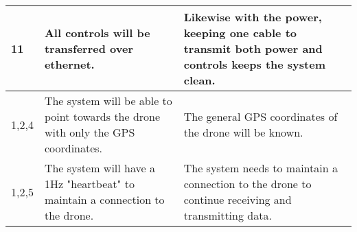 \documentclass[ProductRequirements.tex]{subfiles}
\begin{document}
\begin{center}
\begin{tabular}{| p{2.3cm} | p{5cm} | p{7cm} |}
		11 & All controls will be transferred over ethernet. &  Likewise with the power, keeping one cable to transmit both power and controls keeps the system clean.\\\hline
		1,2,4 & The system will be able to point towards the drone with only the GPS coordinates. & The general GPS coordinates of the drone will be known.    \\\hline
		1,2,5 & The system will have a 1Hz "heartbeat" to maintain a connection to the drone. & The system needs to maintain a connection to the drone to continue receiving and transmitting data.    \\\hline
	\end{tabular}
	\end{center}
\end{document}
